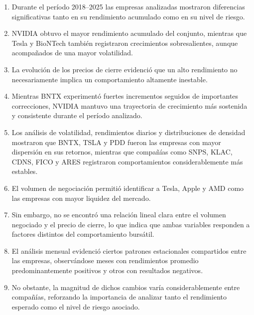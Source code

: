 \begin{enumerate}
    \item Durante el período 2018–2025 las empresas analizadas mostraron diferencias significativas tanto en su rendimiento acumulado como en su nivel de riesgo.
    \item NVIDIA obtuvo el mayor rendimiento acumulado del conjunto, mientras que Tesla y BioNTech también registraron crecimientos sobresalientes, aunque acompañados de una mayor volatilidad.
    \item La evolución de los precios de cierre evidenció que un alto rendimiento no necesariamente implica un comportamiento altamente inestable.
    \item Mientras BNTX experimentó fuertes incrementos seguidos de importantes correcciones, NVIDIA mantuvo una trayectoria de crecimiento más sostenida y consistente durante el período analizado.
    \item Los análisis de volatilidad, rendimientos diarios y distribuciones de densidad mostraron que BNTX, TSLA y PDD fueron las empresas con mayor dispersión en sus retornos, mientras que compañías como SNPS, KLAC, CDNS, FICO y ARES registraron comportamientos considerablemente más estables.
    \item El volumen de negociación permitió identificar a Tesla, Apple y AMD como las empresas con mayor liquidez del mercado.
    \item Sin embargo, no se encontró una relación lineal clara entre el volumen negociado y el precio de cierre, lo que indica que ambas variables responden a factores distintos del comportamiento bursátil.
    \item El análisis mensual evidenció ciertos patrones estacionales compartidos entre las empresas, observándose meses con rendimientos promedio predominantemente positivos y otros con resultados negativos.
    \item No obstante, la magnitud de dichos cambios varía considerablemente entre compañías, reforzando la importancia de analizar tanto el rendimiento esperado como el nivel de riesgo asociado.
\end{enumerate}
